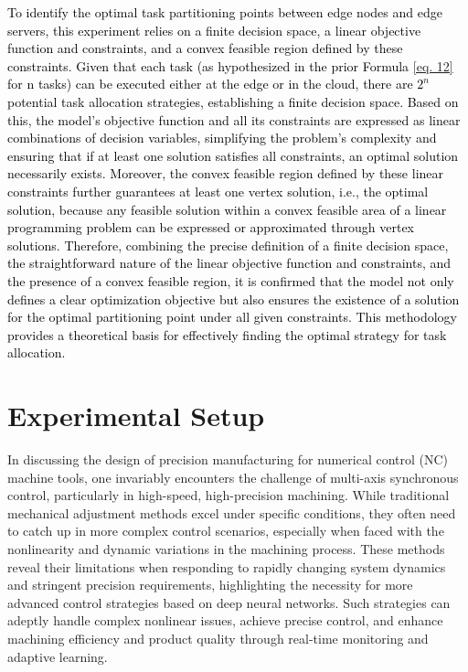 \documentclass[preprint,12pt]{elsarticle}
\begin{document}
\textcolor{black}{To identify the optimal task partitioning points between edge nodes and edge servers, this experiment relies on a finite decision space, a linear objective function and constraints, and a convex feasible region defined by these constraints. Given that each task (as hypothesized in the prior Formula \ref{eq. 12} for n tasks) can be executed either at the edge or in the cloud, there are \(2^n\) potential task allocation strategies, establishing a finite decision space. Based on this, the model's objective function and all its constraints are expressed as linear combinations of decision variables, simplifying the problem's complexity and ensuring that if at least one solution satisfies all constraints, an optimal solution necessarily exists. Moreover, the convex feasible region defined by these linear constraints further guarantees at least one vertex solution, i.e., the optimal solution, because any feasible solution within a convex feasible area of a linear programming problem can be expressed or approximated through vertex solutions. Therefore, combining the precise definition of a finite decision space, the straightforward nature of the linear objective function and constraints, and the presence of a convex feasible region, it is confirmed that the model not only defines a clear optimization objective but also ensures the existence of a solution for the optimal partitioning point under all given constraints. This methodology provides a theoretical basis for effectively finding the optimal strategy for task allocation.}

\section{Experimental Setup}

In discussing the design of precision manufacturing for numerical control (NC) machine tools, one invariably encounters the challenge of multi-axis synchronous control, particularly in high-speed, high-precision machining. While traditional mechanical adjustment methods excel under specific conditions, they often need to catch up in more complex control scenarios, especially when faced with the nonlinearity and dynamic variations in the machining process. These methods reveal their limitations when responding to rapidly changing system dynamics and stringent precision requirements, highlighting the necessity for more advanced control strategies based on deep neural networks. Such strategies can adeptly handle complex nonlinear issues, achieve precise control, and enhance machining efficiency and product quality through real-time monitoring and adaptive learning\cite{zhong2017precise}.
\end{document}
